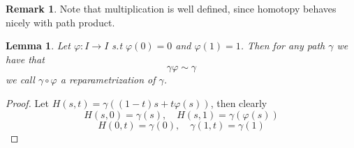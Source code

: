 \documentclass[11pt,a4paper]{article}
\theoremstyle{definition}
\newtheorem{remark}[definition]{Remark}
\theoremstyle{plain}
\newtheorem{lemma}[definition]{Lemma}
\theoremstyle{remark}
\newcommand{\1}{\mathbbm{1}}
\begin{document}
\begin{remark}
    Note that multiplication is well defined, since homotopy behaves nicely with path product.
\end{remark}

\begin{lemma}
    Let $\varphi \colon I \to I$ s.t $\varphi(0) = 0$ and $\varphi(1) = 1$. Then for any path $\gamma$ we have
    that 
    $$\gamma \varphi \sim \gamma$$
    we call $\gamma \circ \varphi$ a reparametrization of $\gamma$. 
\end{lemma}

\begin{proof}
    Let $H(s, t) = \gamma ((1-t) s + t \varphi(s))$, then clearly 
    $$H(s, 0) = \gamma(s), \quad H(s,1) = \gamma(\varphi(s))$$
    $$H(0,t) = \gamma(0), \quad \gamma(1, t) = \gamma(1)$$     
\end{proof}
\end{document}
